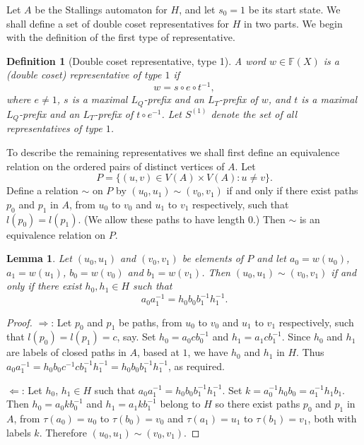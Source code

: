 \documentclass[a4paper,12pt]{article}
\renewcommand{\t}{\tau }
\newtheorem{lemma}[theorem]{Lemma}
\newtheorem{definition}[theorem]{Definition}
\numberwithin{equation}{section}
\numberwithin{figure}{section}
\newcommand{\FF}{\ensuremath{\mathbb{F}}}
\begin{document}

Let $A$ be the Stallings automaton for $H$, and let  $s_0 =
1$ be its start state.
We shall define a set of double coset representatives for $H$ in two parts.
We begin with the definition of the first type of representative.
\begin{definition}[Double coset representative, type 1] \label{def:repres_t1}
A word $w\in \FF(X)$ is a {\em (double coset) representative of
type} $1$ if
\[w=s\circ e \circ t^{-1},\]
where $e\neq 1$, $s$ is a maximal $L_Q$-prefix and an $L_T$-prefix of $w$,
and $t$ is a maximal $L_Q$-prefix and an
$L_T$-prefix of $t\circ e^{-1}$. Let $S^{(1)}$ denote the set of all representatives of type $1$.
\end{definition}


To describe the remaining representatives we shall first define an equivalence
relation on the ordered pairs of distinct vertices of $A$. Let
\[P=\{(u,v)\in V(A)\times V(A): u\neq v\}.\]
Define a relation $\sim$ on $P$ by $(u_0,u_1)\sim (v_0,v_1)$ if and only if
there exist paths $p_0$ and $p_1$ in $A$, from $u_0$ to $v_0$ and $u_1$ to $v_1$
respectively, such that $l(p_0)=l(p_1)$. (We allow these paths to have length $0$.)
Then $\sim$ is an equivalence relation on $P$.

\begin{lemma}\label{lem:equiv_verts}
Let $(u_0,u_1)$ and $(v_0,v_1)$ be elements of $P$ and let
$a_0=w(u_0)$, $a_1=w(u_1)$, $b_0=w(v_0)$ and $b_1=w(v_1)$. Then
$(u_0,u_1)\sim (v_0,v_1)$ if and only if there exist $h_0,h_1\in H$ such that
\[a_0a_1^{-1}=h_0b_0b_1^{-1}h_1^{-1}.\]
\end{lemma}
\begin{proof}
$\Rightarrow$: Let $p_0$ and $p_1$ be paths, from $u_0$ to $v_0$ and $u_1$ to $v_1$
respectively, such that $l(p_0)=l(p_1)=c$, say. Set $h_0=a_0cb_0^{-1}$ and
$h_1=a_1cb_1^{-1}$. Since $h_0$ and $h_1$ are labels of closed paths in $A$, based at $1$, we
have $h_0$ and $h_1$ in $H$. Thus
$a_0a_1^{-1}=h_0b_0c^{-1}cb_1^{-1}h_1^{-1}=h_0b_0b_1^{-1}h_1^{-1}$, as required.

$\Leftarrow$: Let $h_0$, $h_1 \in H$ such that $a_0a_1^{-1}=h_0b_0b_1^{-1}h_1^{-1}$.
Set $k=a_0^{-1}h_0b_0=a_1^{-1}h_1b_1$. Then $h_0=a_0kb_0^{-1}$ and $h_1=a_1kb_1^{-1}$
belong to $H$ so there exist paths $p_0$ and $p_1$ in $A$,
from $\t(a_0)=u_0$ to $\t(b_0)=v_0$ and
$\t(a_1)=u_1$ to $\t(b_1)=v_1$, both with labels $k$.
Therefore $(u_0,u_1)\sim (v_0,v_1)$.
\end{proof}
\end{document}
